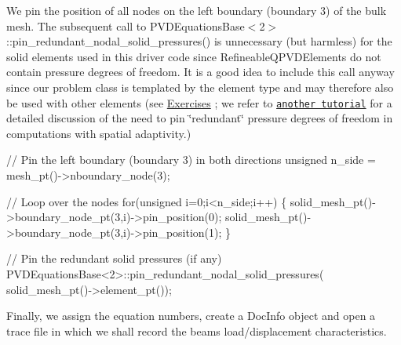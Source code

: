 We pin the position of all nodes on the left boundary (boundary 3) of the bulk mesh. The subsequent call to {\ttfamily P\+V\+D\+Equations\+Base$<$2$>$\+::pin\+\_\+redundant\+\_\+nodal\+\_\+solid\+\_\+pressures()} is unnecessary (but harmless) for the solid elements used in this driver code since {\ttfamily Refineable\+Q\+P\+V\+D\+Elements} do not contain pressure degrees of freedom. It is a good idea to include this call anyway since our problem class is templated by the element type and may therefore also be used with other elements (see \hyperlink{index_ex}{Exercises} ; we refer to \href{../../../navier_stokes/adaptive_driven_cavity/html/index.html}{\tt another tutorial} for a detailed discussion of the need to pin \char`\"{}redundant\char`\"{} pressure degrees of freedom in computations with spatial adaptivity.)


\begin{DoxyCodeInclude}
 
 \textcolor{comment}{// Pin the left boundary (boundary 3) in both directions}
 \textcolor{keywordtype}{unsigned} n\_side = mesh\_pt()->nboundary\_node(3);
 
 \textcolor{comment}{// Loop over the nodes}
 \textcolor{keywordflow}{for}(\textcolor{keywordtype}{unsigned} i=0;i<n\_side;i++)
  \{
   solid\_mesh\_pt()->boundary\_node\_pt(3,i)->pin\_position(0);
   solid\_mesh\_pt()->boundary\_node\_pt(3,i)->pin\_position(1);
  \}

 \textcolor{comment}{// Pin the redundant solid pressures (if any)}
 PVDEquationsBase<2>::pin\_redundant\_nodal\_solid\_pressures(
  solid\_mesh\_pt()->element\_pt());

\end{DoxyCodeInclude}


Finally, we assign the equation numbers, create a {\ttfamily Doc\+Info} object and open a trace file in which we shall record the beam\textquotesingle{}s load/displacement characteristics.






